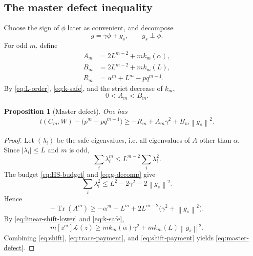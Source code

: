 \documentclass[11pt]{article}
\newtheorem{proposition}[theorem]{Proposition}
\newcommand{\norm}[1]{\left\lVert #1\right\rVert}
\newcommand{\Tr}{\operatorname{Tr}}
\newcommand{\cL}{\mathcal L}
\begin{document}
\subsection{The master defect inequality}\label{subsec:master-defect}

Choose the sign of \(\phi\) later as convenient, and decompose
\begin{equation}\label{eq:g-decomp}
       g=\gamma\phi+g_s,
       \qquad g_s\perp\phi.
\end{equation}
For odd \(m\), define
\begin{align}
 A_m&=2L^{m-2}+mk_m(\alpha),\label{eq:Am-def}\\
 B_m&=2L^{m-2}+mk_m(L),\label{eq:Bm-def}\\
 R_m&=\alpha^m+L^m-pq^{m-1}.
 \label{eq:Rm-def}
\end{align}
By \eqref{eq:L-order}, \eqref{eq:k-safe}, and the strict decrease of
\(k_m\),
\begin{equation}\label{eq:AB-order}
       0<A_m<B_m.
\end{equation}

\begin{proposition}[Master defect]\label{prop:master-defect}
One has
\begin{equation}\label{eq:master-defect}
\begin{aligned}
 t(C_m,W)-\bigl(p^m-pq^{m-1}\bigr)
 \ge -R_m+A_m\gamma^2+B_m\norm{g_s}^2.
\end{aligned}
\end{equation}
\end{proposition}

\begin{proof}
Let \((\lambda_i)\) be the safe eigenvalues, i.e. all eigenvalues of \(A\)
other than \(\alpha\).  Since \(|\lambda_i|\le L\) and \(m\) is odd,
\[
       \sum_i\lambda_i^m
       \le L^{m-2}\sum_i\lambda_i^2.
\]
The budget \eqref{eq:HS-budget} and \eqref{eq:g-decomp} give
\[
       \sum_i\lambda_i^2
       \le L^2-2\gamma^2-2\norm{g_s}^2.
\]
Hence
\begin{equation}\label{eq:trace-payment}
 -\Tr(A^m)
 \ge-\alpha^m-L^m
    +2L^{m-2}\bigl(\gamma^2+\norm{g_s}^2\bigr).
\end{equation}
By \eqref{eq:linear-shift-lower} and \eqref{eq:k-safe},
\begin{equation}\label{eq:shift-payment}
 m[z^m]\cL(z)
 \ge mk_m(\alpha)\gamma^2+mk_m(L)\norm{g_s}^2.
\end{equation}
Combining \eqref{eq:shift}, \eqref{eq:trace-payment}, and
\eqref{eq:shift-payment} yields \eqref{eq:master-defect}.
\end{proof}
\end{document}
